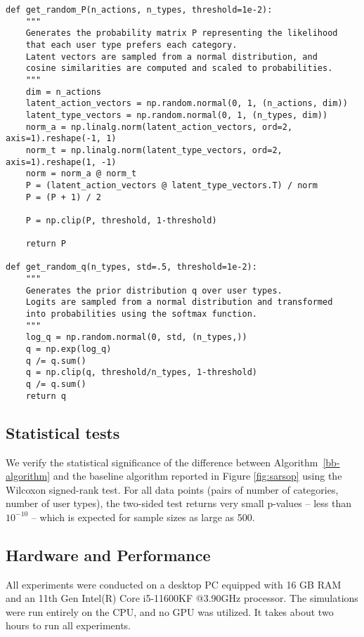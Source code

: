 \begin{verbatim}
def get_random_P(n_actions, n_types, threshold=1e-2):
    """
    Generates the probability matrix P representing the likelihood 
    that each user type prefers each category.
    Latent vectors are sampled from a normal distribution, and 
    cosine similarities are computed and scaled to probabilities.
    """
    dim = n_actions
    latent_action_vectors = np.random.normal(0, 1, (n_actions, dim))
    latent_type_vectors = np.random.normal(0, 1, (n_types, dim))
    norm_a = np.linalg.norm(latent_action_vectors, ord=2, axis=1).reshape(-1, 1)
    norm_t = np.linalg.norm(latent_type_vectors, ord=2, axis=1).reshape(1, -1)
    norm = norm_a @ norm_t
    P = (latent_action_vectors @ latent_type_vectors.T) / norm
    P = (P + 1) / 2

    P = np.clip(P, threshold, 1-threshold)
    
    return P

def get_random_q(n_types, std=.5, threshold=1e-2):
    """
    Generates the prior distribution q over user types.
    Logits are sampled from a normal distribution and transformed 
    into probabilities using the softmax function.
    """
    log_q = np.random.normal(0, std, (n_types,))
    q = np.exp(log_q)
    q /= q.sum()
    q = np.clip(q, threshold/n_types, 1-threshold)
    q /= q.sum()
    return q
\end{verbatim}

\subsection{Statistical tests}

We verify the statistical significance of the difference between Algorithm~\ref{bb-algorithm} and the baseline algorithm reported in Figure \ref{fig:sarsop} using the Wilcoxon signed-rank test. For all data points (pairs of number of categories, number of user types), the two-sided test returns very small p-values -- less than $10^{-10}$ -- which is expected for sample sizes as large as 500.

\subsection{Hardware and Performance}

All experiments were conducted on a desktop PC equipped with 16 GB RAM and an 11th Gen Intel(R) Core i5-11600KF @3.90GHz processor. The simulations were run entirely on the CPU, and no GPU was utilized. It takes about two hours to run all experiments.
